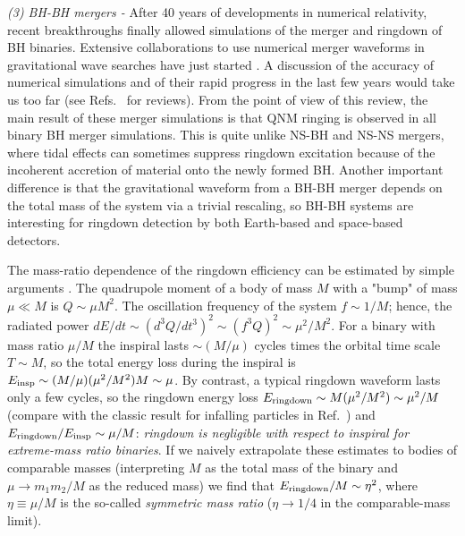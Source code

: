 \documentclass[]{iopart}
\begin{document}
\noindent
{\it (3) BH-BH mergers -} 
%
After 40 years of developments in numerical relativity, recent breakthroughs
\cite{Pretorius:2005gq,Campanelli:2005dd,Baker:2005vv} finally allowed
simulations of the merger and ringdown of BH binaries. Extensive collaborations
to use numerical merger waveforms in gravitational wave searches have just
started \cite{Aylott:2009ya}. A discussion of the accuracy of numerical
simulations and of their rapid progress in the last few years would take us
too far (see Refs.~\cite{Pretorius:2005gq,Hannam:2009rd} for reviews).
%
From the point of view of this review, the main result of these merger
simulations is that QNM ringing is observed in all binary BH merger
simulations. This is quite unlike NS-BH and NS-NS mergers, where tidal effects
can sometimes suppress ringdown excitation because of the incoherent accretion
of material onto the newly formed BH. Another important difference is that the
gravitational waveform from a BH-BH merger depends on the total mass of the
system via a trivial rescaling, so BH-BH systems are interesting for
ringdown detection by both Earth-based and space-based detectors.

The mass-ratio dependence of the ringdown efficiency can be estimated by
simple arguments \cite{Flanagan:1997sx,Berti:2007fi}.  The quadrupole moment
of a body of mass $M$ with a "bump" of mass $\mu\ll M$ is $Q\sim \mu M^2$. The
oscillation frequency of the system $f\sim 1/M$; hence, the radiated power
$dE/dt\sim \left(d^3Q/dt^3\right)^2\sim (f^3 Q)^2\sim \mu^2/M^2$. For a binary
with mass ratio $\mu/M$ the inspiral lasts $\sim (M/\mu)$ cycles times the
orbital time scale $T\sim M$, so the total energy loss during the inspiral is
$E_{\rm insp}\sim (M/\mu)(\mu^2/M^2)M\sim \mu$. By contrast, a typical
ringdown waveform lasts only a few cycles, so the ringdown energy loss $E_{\rm
  ringdown}\sim M(\mu^2/M^2)\sim \mu^2/M$ (compare with the classic result for
infalling particles in Ref.~\cite{Davis:1971gg}) and $E_{\rm ringdown}/E_{\rm
  insp}\sim \mu/M$: {\it ringdown is negligible with respect to inspiral for
  extreme-mass ratio binaries}. If we naively extrapolate these estimates to
bodies of comparable masses (interpreting $M$ as the total mass of the binary
and $\mu\to m_1 m_2/M$ as the reduced mass) we find that $E_{\rm
  ringdown}/M\sim \eta^2$, where $\eta\equiv \mu/M$ is the so-called {\em
  symmetric mass ratio} ($\eta\to 1/4$ in the comparable-mass limit).
\end{document}
